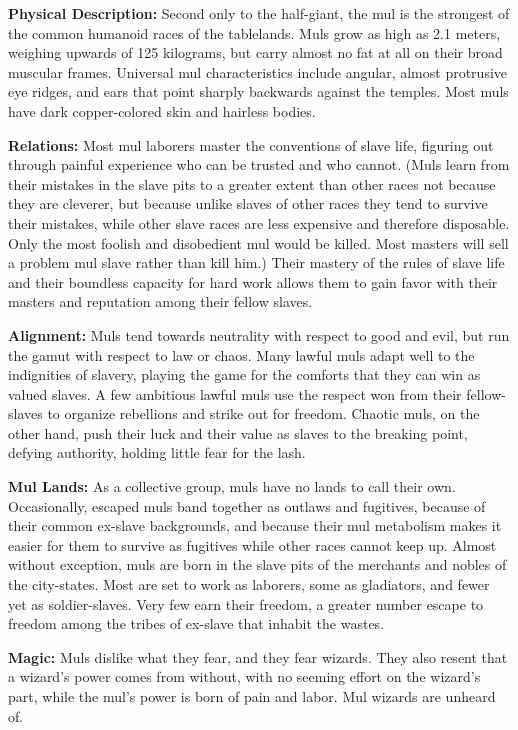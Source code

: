 
\textbf{Physical Description:} Second only to the half-giant, the mul is the strongest of the common humanoid races of the tablelands. Muls grow as high as 2.1 meters, weighing upwards of 125 kilograms, but carry almost no fat at all on their broad muscular frames. Universal mul characteristics include angular, almost protrusive eye ridges, and ears that point sharply backwards against the temples. Most muls have dark copper-colored skin and hairless bodies.

\textbf{Relations:} Most mul laborers master the conventions of slave life, figuring out through painful experience who can be trusted and who cannot. (Muls learn from their mistakes in the slave pits to a greater extent than other races not because they are cleverer, but because unlike slaves of other races they tend to survive their mistakes, while other slave races are less expensive and therefore disposable. Only the most foolish and disobedient mul would be killed. Most masters will sell a problem mul slave rather than kill him.) Their mastery of the rules of slave life and their boundless capacity for hard work allows them to gain favor with their masters and reputation among their fellow slaves.

\textbf{Alignment:} Muls tend towards neutrality with respect to good and evil, but run the gamut with respect to law or chaos. Many lawful muls adapt well to the indignities of slavery, playing the game for the comforts that they can win as valued slaves. A few ambitious lawful muls use the respect won from their fellow-slaves to organize rebellions and strike out for freedom. Chaotic muls, on the other hand, push their luck and their value as slaves to the breaking point, defying authority, holding little fear for the lash.

\textbf{Mul Lands:} As a collective group, muls have no lands to call their own. Occasionally, escaped muls band together as outlaws and fugitives, because of their common ex-slave backgrounds, and because their mul metabolism makes it easier for them to survive as fugitives while other races cannot keep up. Almost without exception, muls are born in the slave pits of the merchants and nobles of the city-states. Most are set to work as laborers, some as gladiators, and fewer yet as soldier-slaves. Very few earn their freedom, a greater number escape to freedom among the tribes of ex-slave that inhabit the wastes.

\textbf{Magic:} Muls dislike what they fear, and they fear wizards. They also resent that a wizard's power comes from without, with no seeming effort on the wizard's part, while the mul's power is born of pain and labor. Mul wizards are unheard of.

